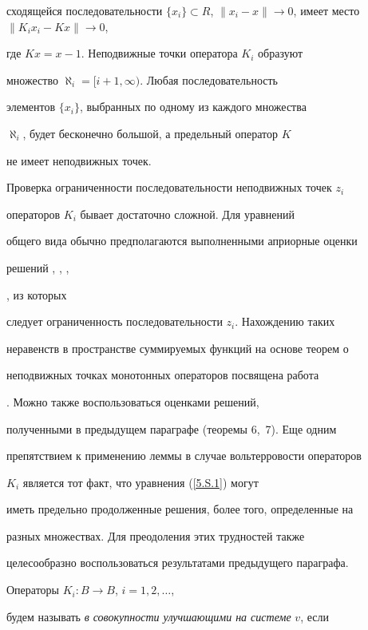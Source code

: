 сходящейся последовательности $\{x_i\} \subset R$, $\|x_i


-x\|\to 0$, имеет место $\|K_i x_i - K x\|\to 0$,


где $Kx=x-1$. Неподвижные точки оператора $K_{i}$ образуют


множество $\aleph_i=[i+1, \infty)$. Любая последовательность


элементов $\{x_i\}$, выбранных по одному из каждого множества


$\aleph_i$, будет бесконечно большой, а предельный оператор $K$


не имеет неподвижных точек.





Проверка ограниченности последовательности неподвижных точек $z_i$


операторов $K_{i}$ бывает достаточно сложной. Для уравнений


общего вида обычно предполагаются выполненными априорные оценки


решений \cite{AzbMakRahFDU}, \cite{AzbMakRahFDU2}, \cite{Maks2},


\cite{GMJ}, из которых


следует ограниченность последовательности $z_i$. Нахождению таких


неравенств в пространстве суммируемых функций на основе теорем о


неподвижных точках монотонных операторов посвящена работа


\cite{Juk10}. Можно также воспользоваться оценками решений,


полученными в предыдущем параграфе (теоремы 6,~7). Еще одним


препятствием к применению леммы в случае вольтерровости операторов


$K_{i} $ является тот факт, что уравнения (\ref{5.S.1}) могут


иметь предельно продолженные решения, более того, определенные на


разных множествах. Для преодоления этих трудностей также


целесообразно воспользоваться результатами предыдущего параграфа.





Операторы $K_{i}:B \to B$, $i=1, 2,\dotsc$,


будем называть {\it в совокупности улучшающими на системе} $v$, если


